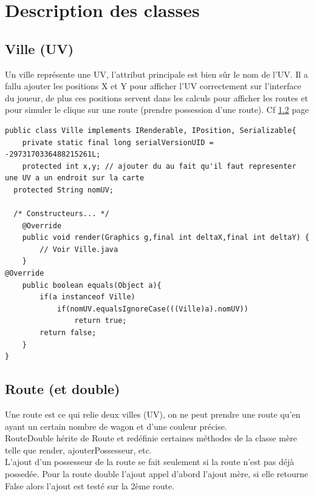 \documentclass{report}
\begin{document}
\section{Description des classes}
\subsection{Ville (UV)} \label{defUV}
Un ville représente une UV, l'attribut principale est bien sûr le nom de l'UV. Il a fallu ajouter les positions X et Y pour afficher l'UV correctement sur l'interface du joueur, de plus ces positions servent dans les calculs pour afficher les routes et pour simuler le clique sur une route (prendre possession d'une route). Cf \ref{defRoute} page \pageref{defRoute}
\begin{lstlisting}[caption=Représentation d'une UV]
public class Ville implements IRenderable, IPosition, Serializable{
	private static final long serialVersionUID = -2973170336488215261L;
	protected int x,y; // ajouter du au fait qu'il faut representer une UV a un endroit sur la carte
  protected String nomUV;

  /* Constructeurs... */
	@Override
	public void render(Graphics g,final int deltaX,final int deltaY) {
		// Voir Ville.java
	}
@Override
	public boolean equals(Object a){
		if(a instanceof Ville)
			if(nomUV.equalsIgnoreCase(((Ville)a).nomUV))
				return true;
		return false;
	}
}
\end{lstlisting}
\subsection{Route (et double)} \label{defRoute}
Une route est ce qui relie deux villes (UV), on ne peut prendre une route qu'en ayant un certain nombre de wagon et d'une couleur précise.\\
RouteDouble hérite de Route et redéfinie certaines méthodes de la classe mère telle que render, ajouterPossesseur, etc.\\
L'ajout d'un possesseur de la route se fait seulement si la route n'est pas déjà possedée. Pour la route double l'ajout appel d'abord l'ajout mère, si elle retourne False alors l'ajout est testé sur la 2ème route.
\end{document}
